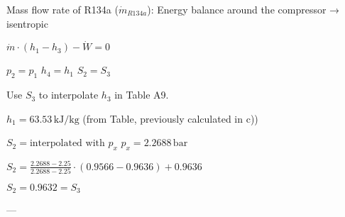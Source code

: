 Mass flow rate of R134a (\( \dot{m}_{R134a} \)):  
Energy balance around the compressor → isentropic  

\( \dot{m} \cdot (h_1 - h_3) - \dot{W} = 0 \)  

\( p_2 = p_1 \)  
\( h_4 = h_1 \)  
\( S_2 = S_3 \)  

Use \( S_3 \) to interpolate \( h_3 \) in Table A9.  

\( h_1 = 63.53 \, \text{kJ/kg} \) (from Table, previously calculated in c))  

\( S_2 = \text{interpolated with } p_x \)  
\( p_x = 2.2688 \, \text{bar} \)  

\( S_2 = \frac{2.2688 - 2.25}{2.2688 - 2.25} \cdot (0.9566 - 0.9636) + 0.9636 \)  

\( S_2 = 0.9632 = S_3 \)  

---